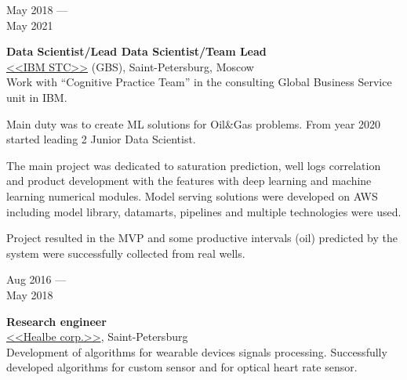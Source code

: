 \documentclass[10pt,a4paper]{article}
\newcommand{\lmpratio}{0.15}
\newcommand{\rmpratio}{0.74}
\newcommand{\vSpace}{0.5cm}
\newcommand{\horizontalSpace}{0.05\textwidth}
\newcommand{\sectionMain}[1]{\textbf{#1}}
\begin{document}
	\begin{minipage}[t]{\lmpratio\textwidth}
		May 2018 --- \\May 2021
	\end{minipage}
	\hspace{\horizontalSpace}
	\begin{minipage}[t]{\rmpratio\textwidth}
		\sectionMain{Data Scientist/Lead Data Scientist/Team Lead}\\
		\href{https://www.ibm.com/ru/rstl/index-en.html}{<<IBM STC>>} (GBS), Saint-Petersburg, Moscow\\[0.5cm]		
		Work with ``Cognitive Practice Team'' in the consulting Global Business Service unit in IBM.
		
		Main duty was to create ML solutions for Oil\&{}Gas problems. From year 2020 started leading 2 Junior Data Scientist.
		

		The main project was dedicated to saturation prediction, well logs correlation and product development with the features with deep learning and machine learning numerical modules. Model serving solutions were developed on AWS including model library, datamarts, pipelines and multiple technologies were used.
				
				
		Project resulted in the MVP and some productive intervals (oil) predicted by the system were successfully collected from real wells.
		
		
	\end{minipage}	
	\vspace{\vSpace}
	
	\begin{minipage}[t]{\lmpratio\textwidth}
		Aug 2016 --- \\May 2018
	\end{minipage}
	\hspace{\horizontalSpace}
	\begin{minipage}[t]{\rmpratio\textwidth}
		\sectionMain{Research engineer}\\
		\href{https://healbe.com/}{<<Healbe corp.>>}, Saint-Petersburg\\[0.5cm]		
		
		 Development of algorithms for wearable devices signals processing. 
		 Successfully developed algorithms for custom sensor and for optical heart rate sensor.
		 
		
	\end{minipage}	
	\vspace{\vSpace}
	
\end{document}
